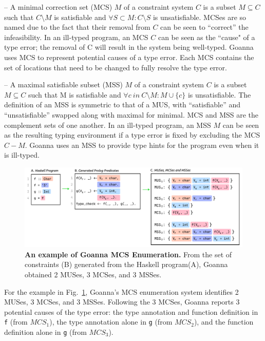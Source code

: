 \documentclass[pdflatex,sn-mathphys-num]{sn-jnl}%
\begin{document}
    – A minimal correction set (MCS) $M$ of a constraint system $C$ is a subset $M \subseteq C$ such that $C \setminus M$ is satisfiable and $\forall{S} \subset M : C \setminus S$ is unsatisfiable. MCSes are so named due to the fact that their removal from $C$ can be seen to “correct” the infeasibility. In an ill-typed program, an MCS $C$ can be seen as the ``cause" of a type error; the removal of C will result in the system being well-typed. Goanna uses MCS to represent potential causes of a type error. Each MCS contains the set of locations that need to be changed to fully resolve the type error.
    
  – A maximal satisfiable subset (MSS) $M$ of a constraint system $C$ is a subset $M \subseteq C$ such that M is satisfiable and $\forall{c}\ in\ C \setminus M:M\cup\{c\}$ is unsatisfiable. The definition of an MSS is symmetric to that of a MUS, with “satisfiable” and “unsatisfiable” swapped along with maximal for minimal. MCS and MSS are the complement sets of one another. In an ill-typed program, an MSS $M$ can be seen as the resulting typing environment if a type error is fixed by excluding the MCS $C - M$. Goanna uses an MSS to provide type hints for the program even when it is ill-typed.
  
 
     \begin{figure}[ht!]
        \centering
        \includegraphics[width=\linewidth]{images/Enumeration-Example}
        \caption[An example of Goanna MCS Enumeration]{\textbf{An example of Goanna MCS Enumeration.} From the set of constraints (B) generated from the Haskell program(A), Goanna obtained 2 MUSes, 3 MCSes, and 3 MSSes. }
        \label{fig:enumeration-example}
    \end{figure}
    
   For the example in Fig.~\ref{fig:enumeration-example}, Goanna's MCS enumeration system identifies 2 MUSes, 3 MCSes, and 3 MSSes. Following the 3 MCSes, Goanna reports 3 potential causes of the type error: the type annotation and function definition in \texttt{f} (from $MCS_1$), the type annotation alone in \texttt{g} (from $MCS_2$), and the function definition alone in \texttt{g} (from $MCS_3$). 
\end{document}
